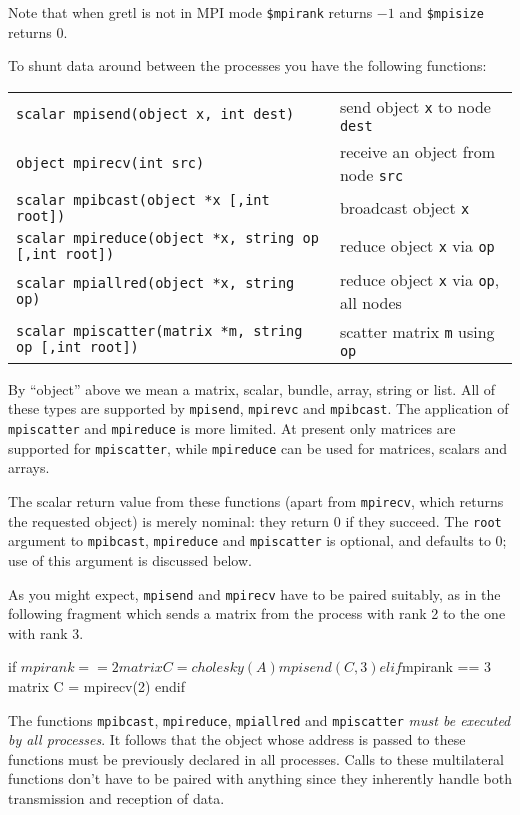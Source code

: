 \documentclass{article}
\begin{document}
Note that when gretl is not in MPI mode \texttt{\$mpirank} returns
$-1$ and \texttt{\$mpisize} returns 0.

To shunt data around between the processes you have the following
functions:
\begin{center}
\begin{tabular}{ll}
\texttt{scalar mpisend(object x, int dest)} &
  send object \texttt{x} to node \texttt{dest}\\
\texttt{object mpirecv(int src)} &
  receive an object from node \texttt{src} \\
\texttt{scalar mpibcast(object *x [,int root])} &
  broadcast object \texttt{x} \\
\texttt{scalar mpireduce(object *x, string op [,int root])} &
  reduce object \texttt{x} via \texttt{op} \\
\texttt{scalar mpiallred(object *x, string op)} &
  reduce object \texttt{x} via \texttt{op}, all nodes \\
\texttt{scalar mpiscatter(matrix *m, string op [,int root])} &
  scatter matrix \texttt{m} using \texttt{op} \\
\end{tabular}
\end{center}
By ``object'' above we mean a matrix, scalar, bundle, array, string or
list. All of these types are supported by \texttt{mpisend},
\texttt{mpirevc} and \texttt{mpibcast}. The application of
\texttt{mpiscatter} and \texttt{mpireduce} is more limited. At present
only matrices are supported for \texttt{mpiscatter}, while
\texttt{mpireduce} can be used for matrices, scalars and arrays.

The scalar return value from these functions (apart from
\texttt{mpirecv}, which returns the requested object) is merely
nominal: they return 0 if they succeed. The \texttt{root} argument to
\texttt{mpibcast}, \texttt{mpireduce} and \texttt{mpiscatter} is
optional, and defaults to 0; use of this argument is discussed below.

As you might expect, \texttt{mpisend} and \texttt{mpirecv} have to be
paired suitably, as in the following fragment which sends a matrix
from the process with rank 2 to the one with rank 3.
\begin{code}
if $mpirank == 2
  matrix C = cholesky(A)
  mpisend(C, 3)
elif $mpirank == 3
  matrix C = mpirecv(2)
endif
\end{code}

The functions \texttt{mpibcast}, \texttt{mpireduce},
\texttt{mpiallred} and \texttt{mpiscatter} \textit{must be executed by
  all processes}. It follows that the object whose address is passed
to these functions must be previously declared in all processes. Calls
to these multilateral functions don't have to be paired with anything
since they inherently handle both transmission and reception of data.
\end{document}
